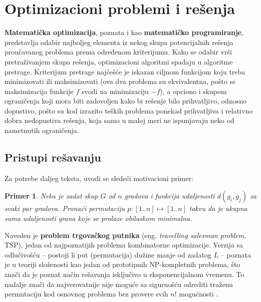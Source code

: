 \documentclass[a4paper]{article}
\newtheorem{primer}{Primer}[section]
\begin{document}
\section{Optimizacioni problemi i rešenja}
\label{sec:optimizacioniProblemi}

\textbf{Matematička optimizacija}, poznata i kao \textbf{matematičko programiranje}, predstavlja odabir najboljeg elementa iz nekog skupa potencijalnih rešenja proučavanog problema prema određenom kriterijumu. Kako se odabir vrši pretraživanjem skupa rešenja, optimizacioni algoritmi spadaju u algoritme pretrage. Kriterijum pretrage najčešće je iskazan ciljnom funkcijom koju treba minimizovati ili maksimizovati (ova dva problema su ekvivalentna, pošto se maksimizacija funkcije $f$ svodi na minimizaciju $-f$), a opciono i skupom ograničenja koji mora biti zadovoljen kako bi rešenje bilo prihvatljivo, odnosno dopustivo, pošto su kod izrazito teških problema ponekad prihvatljiva i relativno dobra nedopustiva rešenja, koja samo u maloj meri ne ispunjavaju neko od nametnutih ograničenja.

\subsection{Pristupi rešavanju}

Za potrebe daljeg teksta, uvodi se sledeći motivacioni primer:

\begin{primer}
Neka je zadat skup $G$ od $n$ gradova i funkcija udaljenosti $d(g_i, g_j)$ za svaki par gradova. Pronaći permutaciju $p: [1..n] \mapsto [1..n]$ takvu da je ukupna suma udaljenosti grana koje se prolaze obilaskom minimalna.
\end{primer}

Naveden je \textbf{problem trgovačkog putnika} (eng. \textit{travelling salesman problem}, TSP), jedan od najpoznatijih problema kombinatorne optimizacije. Verzija sa odlučivošću -- postoji li put (permutacija) dužine manje od zadatog $L$  -- poznata je u teoriji složenosti kao jedan od prototipnih NP-kompletnih problema, što znači da je poznat način rešavanja isključivo u eksponencijalnom vremenu. To nadalje znači da najverovatnije nije moguće sa sigurnošću odrediti traženu permutaciju kod osnovnog problema bez provere svih $n!$ mogućnosti \cite{ri}.
\end{document}
